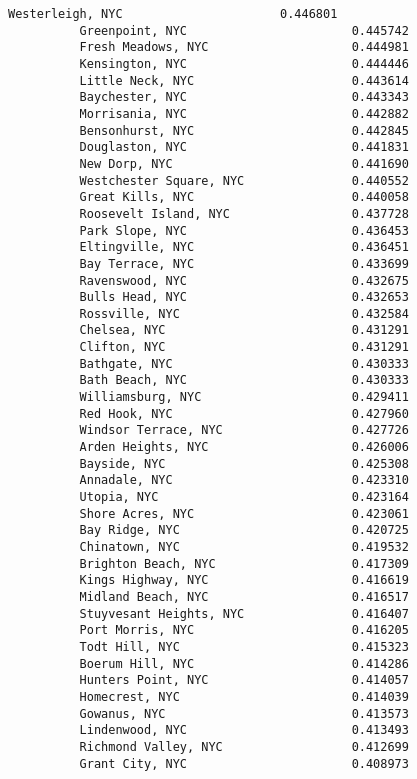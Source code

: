 \documentclass[11pt]{article}
\begin{document}
\begin{Verbatim}[commandchars=\\\{\}]
          Westerleigh, NYC                      0.446801
          Greenpoint, NYC                       0.445742
          Fresh Meadows, NYC                    0.444981
          Kensington, NYC                       0.444446
          Little Neck, NYC                      0.443614
          Baychester, NYC                       0.443343
          Morrisania, NYC                       0.442882
          Bensonhurst, NYC                      0.442845
          Douglaston, NYC                       0.441831
          New Dorp, NYC                         0.441690
          Westchester Square, NYC               0.440552
          Great Kills, NYC                      0.440058
          Roosevelt Island, NYC                 0.437728
          Park Slope, NYC                       0.436453
          Eltingville, NYC                      0.436451
          Bay Terrace, NYC                      0.433699
          Ravenswood, NYC                       0.432675
          Bulls Head, NYC                       0.432653
          Rossville, NYC                        0.432584
          Chelsea, NYC                          0.431291
          Clifton, NYC                          0.431291
          Bathgate, NYC                         0.430333
          Bath Beach, NYC                       0.430333
          Williamsburg, NYC                     0.429411
          Red Hook, NYC                         0.427960
          Windsor Terrace, NYC                  0.427726
          Arden Heights, NYC                    0.426006
          Bayside, NYC                          0.425308
          Annadale, NYC                         0.423310
          Utopia, NYC                           0.423164
          Shore Acres, NYC                      0.423061
          Bay Ridge, NYC                        0.420725
          Chinatown, NYC                        0.419532
          Brighton Beach, NYC                   0.417309
          Kings Highway, NYC                    0.416619
          Midland Beach, NYC                    0.416517
          Stuyvesant Heights, NYC               0.416407
          Port Morris, NYC                      0.416205
          Todt Hill, NYC                        0.415323
          Boerum Hill, NYC                      0.414286
          Hunters Point, NYC                    0.414057
          Homecrest, NYC                        0.414039
          Gowanus, NYC                          0.413573
          Lindenwood, NYC                       0.413493
          Richmond Valley, NYC                  0.412699
          Grant City, NYC                       0.408973

\end{Verbatim}
\end{document}
